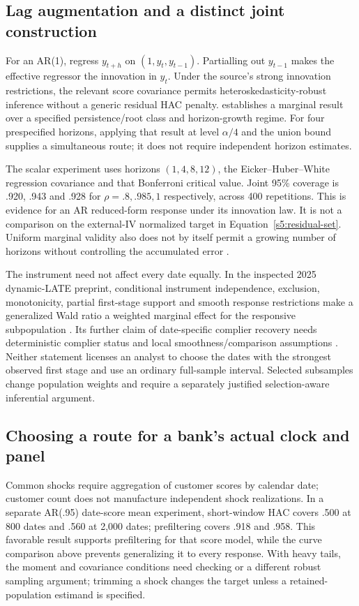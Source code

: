 \subsection{Lag augmentation and a distinct joint construction}
For an AR(1), regress $y_{t+h}$ on $(1,y_t,y_{t-1})$. Partialling out
$y_{t-1}$ makes the effective regressor the innovation in $y_t$. Under the
source's strong innovation restrictions, the relevant score covariance
permits heteroskedasticity-robust inference without a generic residual HAC
penalty. \citet[Definition 1, Assumptions 2--3 and Proposition 1]{lpaug2020}
establishes a marginal result over a specified persistence/root class and
horizon-growth regime. For four prespecified horizons, applying that result
at level $\alpha/4$ and the union bound supplies a simultaneous route;
it does not require independent horizon estimates.

The scalar experiment uses horizons $(1,4,8,12)$, the Eicker--Huber--White
regression covariance and that Bonferroni critical value. Joint 95\%
coverage is .920, .943 and .928 for $\rho=.8,.985,1$ respectively, across
400 repetitions. This is evidence for an AR reduced-form response under
its innovation law. It is not a comparison on the external-IV normalized
target in Equation~\eqref{s5:residual-set}. Uniform marginal validity also
does not by itself permit a growing number of horizons without controlling
the accumulated error \citep{inoue2023}.

The instrument need not affect every date equally. In the inspected 2025
dynamic-LATE preprint, conditional instrument independence, exclusion,
monotonicity, partial first-stage support and smooth response restrictions
make a generalized Wald ratio a weighted marginal effect for the responsive
subpopulation \citep[Assumptions 2.1--2.5 and Proposition 2.1]{casini2025}.
Its further claim of date-specific complier recovery needs deterministic
complier status and local smoothness/comparison assumptions
\citep[Assumptions 2.6--2.8]{casini2025}. Neither statement licenses an
analyst to choose the dates with the strongest observed first stage and use
an ordinary full-sample interval. Selected subsamples change population
weights and require a separately justified selection-aware inferential argument.

\subsection{Choosing a route for a bank's actual clock and panel}
Common shocks require aggregation of customer scores by calendar date;
customer count does not manufacture independent shock realizations. In a
separate AR(.95) date-score mean experiment, short-window HAC covers .500
at 800 dates and .560 at 2,000 dates; prefiltering covers .918 and .958.
This favorable result supports prefiltering for that score model, while
the curve comparison above prevents generalizing it to every response.
With heavy tails, the moment and covariance conditions need checking or a
different robust sampling argument; trimming a shock changes the target
unless a retained-population estimand is specified.

